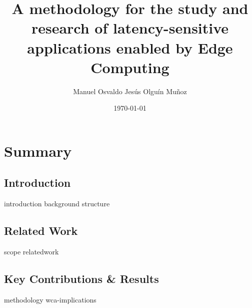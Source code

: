 \documentclass[electronic,oldfontcommands]{kthesis}
\begin{document}
\title{A methodology for the study and research of latency-sensitive applications enabled by Edge Computing}
\subtitle{{}}
\author{Manuel {Osvaldo Jesús} {Olguín Muñoz}}
\date{\today}
\address{%
	KTH Royal Institute of Technology\\%
	School of Electrical Engineering and Computer Science\\%
	Division of Information Science and Engineering\\%
	SE-10044 Stockholm\\%
	Sweden%
}

\maketitle

\frontmatter %





\mainmatter %

\tableofcontents%
\glsresetall{} %
\part{Summary}\label{part:summary}
\chapter{Introduction}\label{chap:introduction}
{introduction}
{background}
{structure}

\chapter{Related Work}\label{chap:relwork}
{scope}
{relatedwork}

\chapter{Key Contributions \& Results}\label{chap:contributions}
{methodology}
{wca-implications}
\end{document}
